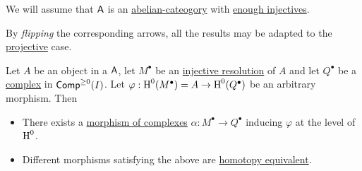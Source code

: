 \documentclass[../../../main]{subfiles}
\begin{document}
We will assume that \(\category{A}\) is an \hyperref[def:abelian-category]{abelian-cateogory} with \hyperref[def:enough-injectives-projectives]{enough injectives}.

By \textit{flipping} the corresponding arrows, all the results may be adapted to the \hyperref[def:injective-projective-object]{projective} case.

\begin{lemma}\label{lemma:lifting-to-cohomology}
  Let \(A\) be an object in a \(\category{A}\), let \(M^{\bullet}\) be an \hyperref[def:injective-projective-resolution]{injective resolution} of \(A\) and let \(Q^{\bullet}\) be a \hyperref[def:complex]{complex} in \(\Complex[\geq 0]{I}\).
  Let \(\varphi: \cohomology{0}(M^{\bullet}) = A \to \cohomology{0}(Q^{\bullet})\) be an arbitrary morphism. Then
  \begin{itemize}
    \item There exists a \hyperref[def:complex-morphism]{morphism of complexes} \(\alpha: M^{\bullet} \to Q^{\bullet}\) inducing \(\varphi\) at the level of \(\cohomology{0}\).
    \item Different morphisms satisfying the above are \hyperref[def:homotopy-equivalence]{homotopy equivalent}.
  \end{itemize}
\end{lemma}
\end{document}
